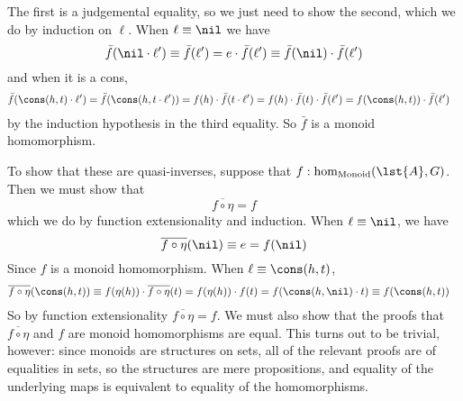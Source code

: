 The first is a judgemental equality, so we just need to show the second, which
we do by induction on $\ell$.  When $\ell \equiv \nil$ we have
\[
  \bar{f}(\nil \cdot \ell')
  \equiv
  \bar{f}(\ell')
  =
  e \cdot \bar{f}(\ell')
  \equiv
  \bar{f}(\nil) \cdot \bar{f}(\ell')
\]
and when it is a cons,
\begin{align*}
  \bar{f}(\cons(h, t) \cdot \ell')
  &=
  \bar{f}(\cons(h, t \cdot \ell'))
  =
  f(h) \cdot \bar{f}(t \cdot \ell')
  =
  f(h) \cdot \bar{f}(t) \cdot \bar{f}(\ell')
  =
  f(\cons(h, t)) \cdot \bar{f}(\ell')
\end{align*}
by the induction hypothesis in the third equality.  So $\bar{f}$ is a monoid
homomorphism.


To show that these are quasi-inverses, suppose that $f :
\hom_{\text{Monoid}}(\lst{A}, G)$.  Then we must show that
\[
  \overline{f \circ \eta} = f
\]
which we do by function extensionality and induction.  When $\ell \equiv \nil$,
we have
\[
  \overline{f \circ \eta}(\nil) \equiv e = f(\nil)
\]
Since $f$ is a monoid homomorphism.  When $\ell \equiv \cons(h, t)$,
\begin{align*}
  \overline{f \circ \eta}(\cons(h, t))
  &\equiv
  f(\eta(h))
  \cdot
  \overline{f \circ \eta}(t)
  =
  f(\eta(h))
  \cdot
  f(t)
  =
  f(\cons(h, \nil) \cdot t)
  \equiv
  f(\cons(h, t))
\end{align*}
So by function extensionality $\overline{f \circ \eta} = f$.  We must
also show that the proofs that $\overline{f \circ \eta}$ and $f$ are
monoid homomorphisms are equal.  This turns out to be trivial,
however: since monoids are structures on sets, all of the relevant
proofs are of equalities in sets, so the structures are mere
propositions, and equality of the underlying maps is equivalent to
equality of the homomorphisms.


